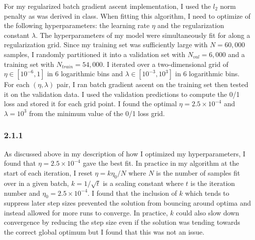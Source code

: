 \documentclass[12pt]{amsart}
\begin{document}
For my regularized batch gradient ascent implementation, I used the $l_2$ norm penalty as was derived in class.  When fitting this algorithm, I need to optimize of the following hyperparameters: the learning rate $\eta$ and the regularization constant $\lambda$.  The hyperparameters of my model were simultaneously fit for along a regularization grid.  Since my training set was sufficiently large with $N = 60,000$ samples, I randomly partitioned it into a validation set with $N_{val} = 6,000$ and a training set with $N_{train} = 54,000$.  I iterated over a two-dimensional grid of $\eta \in [10^{-6},1]$ in 6 logarithmic bins and $\lambda \in [10^{-3},10^{3}]$ in 6 logarithmic bins.  For each $(\eta,\lambda)$ pair, I ran batch gradient ascent on the training set then tested it on the validation data.  I used the validation predictions to compute the 0/1 loss and stored it for each grid point.  I found the optimal $\eta = 2.5 \times 10^{-4}$ and $\lambda = 10^3$ from the minimum value of the 0/1 loss grid.  

\subsubsection*{2.1.1}
As discussed above in my description of how I optimized my hyperparameters, I found that $\eta = 2.5 \times 10^{-4}$ gave the best fit.  In practice in my algorithm at the start of each iteration, I reset $\eta = k\eta_0/N$ where $N$ is the number of samples fit over in a given batch, $k = 1/\sqrt{t}$ is a scaling constant where $t$ is the iteration number and $\eta_0 = 2.5 \times 10^{-4}$.  I found that the inclusion of $k$ which tends to suppress later step sizes prevented the solution from bouncing around optima and instead allowed for more runs to converge.  In practice, $k$ could also slow down convergence by reducing the step size even if the solution was tending towards the correct global optimum but I found that this was not an issue.
\end{document}
